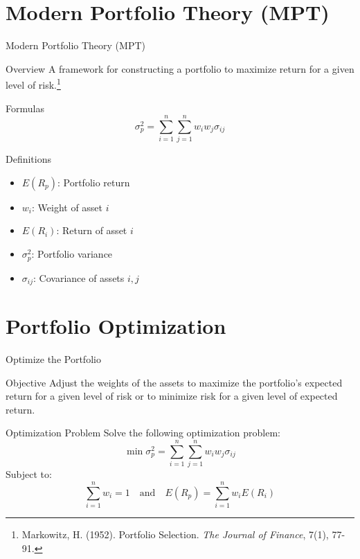 \documentclass{beamer}
\begin{document}
\section{Modern Portfolio Theory (MPT)}
\begin{frame}{Modern Portfolio Theory (MPT)}
    \begin{block}{Overview}
        A framework for constructing a portfolio to maximize return for a given level of risk.\footnote{Markowitz, H. (1952). Portfolio Selection. \textit{The Journal of Finance}, 7(1), 77-91.}
    \end{block}
    \begin{block}{Formulas}
            \begin{equation*}
                \sigma_p^2 = \sum_{i=1}^{n} \sum_{j=1}^{n} w_i w_j \sigma_{ij}
            \end{equation*}
    \end{block}
    \begin{block}{Definitions}
        \begin{multicols}{2}
            \begin{itemize}
                \item \(E(R_p)\): Portfolio return
                \item \(w_i\): Weight of asset \(i\)
                \item \(E(R_i)\): Return of asset \(i\)
                \item \(\sigma_p^2\): Portfolio variance
                \item \(\sigma_{ij}\): Covariance of assets \(i, j\)
            \end{itemize}
        \end{multicols}
    \end{block}
\end{frame}

\section{Portfolio Optimization}
\begin{frame}{Optimize the Portfolio}
    \begin{block}{Objective}
        Adjust the weights of the assets to maximize the portfolio's expected return for a given level of risk or to minimize risk for a given level of expected return.
    \end{block}
    \begin{block}{Optimization Problem}
        Solve the following optimization problem:
        \begin{equation*}
            \min \sigma_p^2 = \sum_{i=1}^{n} \sum_{j=1}^{n} w_i w_j \sigma_{ij}
        \end{equation*}
        Subject to:
        \begin{equation*}
            \sum_{i=1}^{n} w_i = 1 \quad \text{and} \quad E(R_p) = \sum_{i=1}^{n} w_i E(R_i)
        \end{equation*}
    \end{block}
\end{frame}
\end{document}
